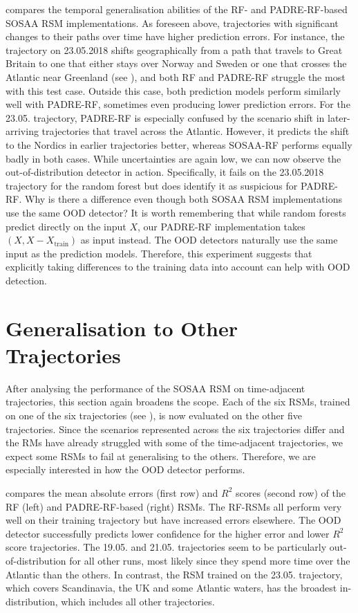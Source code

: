 \noindent {} compares the temporal generalisation abilities of the RF- and PADRE-RF-based SOSAA RSM implementations. As foreseen above, trajectories with significant changes to their paths over time have higher prediction errors. For instance, the trajectory on 23.05.2018 shifts geographically from a path that travels to Great Britain to one that either stays over Norway and Sweden or one that crosses the Atlantic near Greenland (see ), and both RF and PADRE-RF struggle the most with this test case. Outside this case, both prediction models perform similarly well with PADRE-RF, sometimes even producing lower prediction errors. For the 23.05. trajectory, PADRE-RF is especially confused by the scenario shift in later-arriving trajectories that travel across the Atlantic. However, it predicts the shift to the Nordics in earlier trajectories better, whereas SOSAA-RF performs equally badly in both cases. While uncertainties are again low, we can now observe the out-of-distribution detector in action. Specifically, it fails on the 23.05.2018 trajectory for the random forest but does identify it as suspicious for PADRE-RF. Why is there a difference even though both SOSAA RSM implementations use the same OOD detector? It is worth remembering that while random forests predict directly on the input $X$, our PADRE-RF implementation takes $(X, X-X_{\text{train}})$ as input instead. The OOD detectors naturally use the same input as the prediction models. Therefore, this experiment suggests that explicitly taking differences to the training data into account can help with OOD detection.

\section{Generalisation to Other Trajectories} \label{txt:trajectory-generalisation}

After analysing the performance of the SOSAA RSM on time-adjacent trajectories, this section again broadens the scope. Each of the six RSMs, trained on one of the six trajectories (see ), is now evaluated on the other five trajectories. Since the scenarios represented across the six trajectories differ and the RMs have already struggled with some of the time-adjacent trajectories, we expect some RSMs to fail at generalising to the others. Therefore, we are especially interested in how the OOD detector performs.

 compares the mean absolute errors (first row) and $R^2$ scores (second row) of the RF (left) and PADRE-RF-based (right) RSMs. The RF-RSMs all perform very well on their training trajectory but have increased errors elsewhere. The OOD detector successfully predicts lower confidence for the higher error and lower $R^2$ score trajectories. The 19.05. and 21.05. trajectories seem to be particularly out-of-distribution for all other runs, most likely since they spend more time over the Atlantic than the others. In contrast, the RSM trained on the 23.05. trajectory, which covers Scandinavia, the UK and some Atlantic waters, has the broadest in-distribution, which includes all other trajectories.

